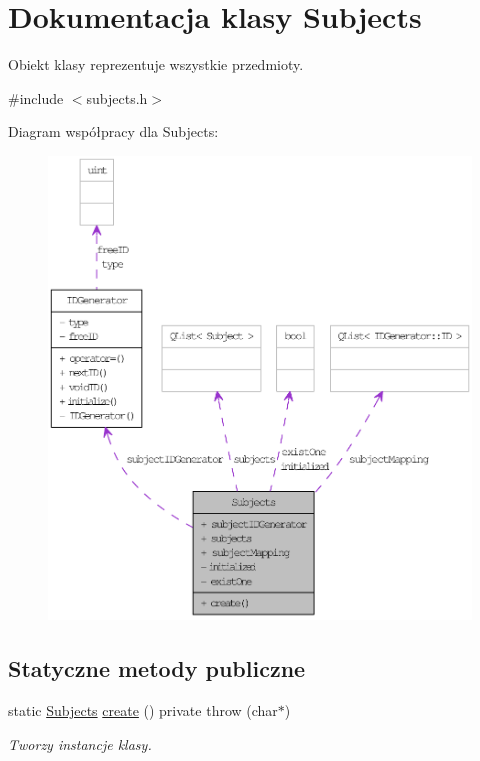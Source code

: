 \hypertarget{classSubjects}{
\section{Dokumentacja klasy Subjects}
\label{classSubjects}
}


Obiekt klasy reprezentuje wszystkie przedmioty.  




{\ttfamily \#include $<$subjects.h$>$}



Diagram współpracy dla Subjects:\nopagebreak
\begin{figure}[H]
\begin{center}
\leavevmode
\includegraphics[width=400pt]{classSubjects__coll__graph}
\end{center}
\end{figure}
\subsection*{Statyczne metody publiczne}
\begin{DoxyCompactItemize}
\item 
static \hyperlink{classSubjects}{Subjects} \hyperlink{classSubjects_aec561b25eff855874861326e29efb743}{create} () private  throw (char$\ast$)
\begin{DoxyCompactList}\small\item\em Tworzy instancje klasy. \item\end{DoxyCompactList}\end{DoxyCompactItemize}
